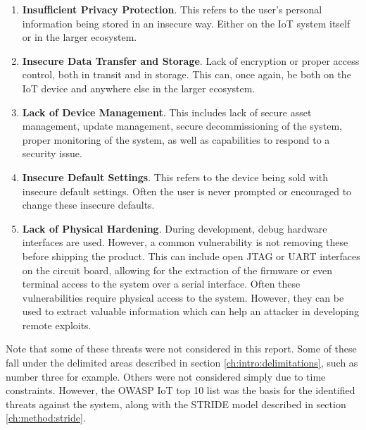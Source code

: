 \begin{enumerate}
    \item \textbf{Insufficient Privacy Protection}. This refers to the user's personal information being stored in an insecure way. Either on the IoT system itself or in the larger ecosystem.
    
    \item \textbf{Insecure Data Transfer and Storage}. Lack of encryption or proper access control, both in transit and in storage. This can, once again, be both on the IoT device and anywhere else in the larger ecosystem.
    
    \item \textbf{Lack of Device Management}. This includes lack of secure asset management, update management, secure decommissioning of the system, proper monitoring of the system, as well as capabilities to respond to a security issue.
    
    \item \textbf{Insecure Default Settings}. This refers to the device being sold with insecure default settings. Often the user is never prompted or encouraged to change these insecure defaults.
    
    \item \textbf{Lack of Physical Hardening}. During development, debug hardware interfaces are used. However, a common vulnerability is not removing these before shipping the product. This can include open JTAG or UART interfaces on the circuit board, allowing for the extraction of the firmware or even terminal access to the system over a serial interface. Often these vulnerabilities require physical access to the system. However, they can be used to extract valuable information which can help an attacker in developing remote exploits.
\end{enumerate}
Note that some of these threats were not considered in this report. Some of these fall under the delimited areas described in section \ref{ch:intro:delimitations}, such as number three for example. Others were not considered simply due to time constraints. However, the OWASP IoT top 10 list was the basis for the identified threats against the system, along with the STRIDE model described in section \ref{ch:method:stride}.


